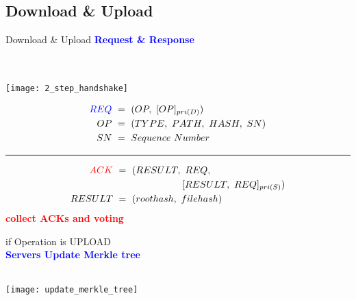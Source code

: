 \subsection{Download \& Upload}
\begin{frame}{Download \& Upload}
	\centering
	\textcolor{blue}{\textbf{Request \& Response}}\\
	~\\
	~\\
	\begin{minipage}{.45\textwidth}
		\texttt{[image: 2\_step\_handshake]}
    \end{minipage}%
	\begin{minipage}{.55\textwidth}
    	\footnotesize
		\centering
		\begin{equation*} \label{eq1}
                \begin{split}
                        \textcolor{blue}{REQ}\ & =\ (OP,\ [OP]_{pri(D)}) \\
                        OP\ & =\ (TYPE,\ PATH,\ HASH,\ SN) \\
                        SN\ & =\ Sequence\ Number
                \end{split}
        \end{equation*}
        \hrule{}
        \begin{equation*} \label{eq2}
                \begin{split}
                        \textcolor{red}{ACK}\ & =\ (RESULT,\ REQ,\\
                        & \tab{}\tab{}[RESULT,\ REQ]_{pri(S)}) \\
                        RESULT\ & =\ (roothash,\ filehash)
                \end{split}
        \end{equation*}
        \textcolor{red}{\textbf{collect ACKs and voting}}
    \end{minipage}%
\end{frame}

\begin{frame}{if Operation is UPLOAD}
	\centering
    ~\\
	\textcolor{blue}{\textbf{Servers Update Merkle tree}}\\
	~\\
	\begin{center}
		\texttt{[image: update\_merkle\_tree]}
	\end{center}
\end{frame}

